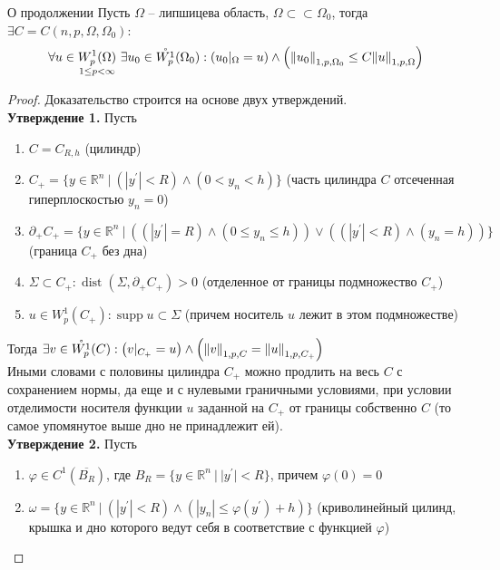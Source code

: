 \documentclass[12pt,a4paper]{article}
\newcommand{\Real}{\mathbb{R}}
\newcommand{\ssubset}{\subset \subset}
\DeclareMathOperator\supp{supp}
\DeclareMathOperator\dist{dist}
\begin{document}
\begin{theorem}{О продолжении}{}\label{th:1}
	Пусть $\Omega$ -- липшицева область, $\Omega \ssubset \Omega_0$, тогда $\exists C = C(n, p, \Omega, \Omega_0)$:
	\begin{equation*}
		\forall u \in \underset{1 \leq p < \infty}{W_p^1 (\Omega)} \ \exists u_0 \in \mathring{W_p^1} (\Omega_0): \left(u_0 |_\Omega = u\right) \wedge \left(\norm{u_0}_{1, p, \Omega_0} \leq C \norm{u}_{1, p, \Omega}\right)
	\end{equation*}
\end{theorem}
\begin{proof}
	Доказательство строится на основе двух утверждений. \\
	\textbf{Утверждение 1.} Пусть
	\begin{enumerate}
		\item $C = C_{R, h}$ (цилиндр)
		\item $C_+ = \{ y \in \Real^n \ | \ (|y^\prime| < R) \wedge (0 < y_n < h) \}$ (часть цилиндра $C$ отсеченная гиперплоскостью $y_n = 0$)
		\item $\partial_+ C_+ = \{ y \in \Real^n \ | \ \left(\left(|y^\prime| = R\right)\wedge \left(0 \leq y_n \leq h\right)\right)\vee\left(\left(|y^\prime| < R\right)\wedge\left(y_n = h\right)\right)\}$ (граница $C_+$ без дна)
		\item $\Sigma \subset C_+: \dist(\Sigma, \partial_+ C_+) > 0$ (отделенное от границы подмножество $C_+$)
		\item $u \in W_p^1 (C_+): \supp{u} \subset \Sigma$ (причем носитель $u$ лежит в этом подмножестве)
	\end{enumerate}
	Тогда $\exists v \in \mathring{W_p^1} (C): \left(v|_{C_+} = u\right) \wedge \left(\norm{v}_{1, p, C} = \norm{u}_{1, p, C_+}\right)$ \\ Иными словами с половины цилиндра $C_+$ можно продлить на весь $C$ с сохранением нормы, да еще и с нулевыми граничными условиями, при условии отделимости носителя функции $u$ заданной на $C_+$ от границы собственно $C$ (то самое упомянутое выше дно не принадлежит ей). \\
	\textbf{Утверждение 2.} Пусть
	\begin{enumerate}
		\item $\varphi \in C^1 (\overline{B_R})$, где $B_R = \{ y \in \Real^n \ | \ |y^\prime| < R\}$, причем $\varphi(0) = 0$
		\item $\omega = \{ y \in \Real^n \ | \ (|y^\prime| < R) \wedge (|y_n| \leq \varphi (y^\prime) + h) \}$ (криволинейный цилинд, крышка и дно которого ведут себя в соответствие с функцией $\varphi$)

\end{enumerate}
\end{proof}
\end{document}
